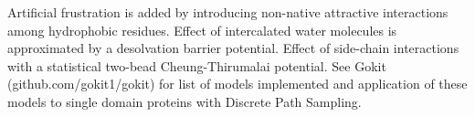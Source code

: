 \documentclass[a0paper,portrait]{baposter}
\begin{document}
\begin{poster}
{Artificial frustration is added by introducing non-native attractive interactions among hydrophobic residues. 
Effect of intercalated water molecules is approximated by a desolvation barrier potential\cite{Chan}. Effect of side-chain interactions with a statistical two-bead Cheung-Thirumalai potential\cite{Cheung}. See Gokit (github.com/gokit1/gokit)\cite{Neelamraju19a} for list of models implemented and application of these models to single domain proteins with Discrete Path Sampling.}



\end{poster}
\end{document}
